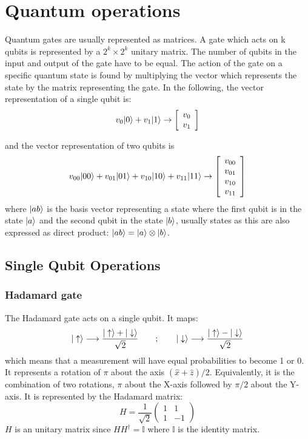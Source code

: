 \chapter{Quantum operations}
\label{operations}
Quantum gates are usually represented as matrices. A gate which acts on k qubits is represented by a $2^k\times2^k$ unitary matrix.
The number of qubits in the input and output of the gate have to be equal. The action of the gate on a specific quantum state is found by multiplying the vector which represents the state by the matrix representing the gate. In the following, the vector representation of a single qubit is:
\begin{equation}
  v_0|0\rangle + v_1|1\rangle \rightarrow \left[\begin{array}{c}
  v_0 \\
  v_1
  \end{array}\right]
\end{equation}

and the vector representation of two qubits is
\begin{equation}
  v_{00}|00\rangle + v_{01}|01\rangle + v_{10}|10\rangle + v_{11}|11\rangle \rightarrow
  \left[\begin{array}{c}
  v_{00} \\
  v_{01} \\
  v_{10} \\
  v_{11}
  \end{array}\right]
\end{equation}
where $|ab\rangle$ is the basis vector representing a state where the first qubit is in the state $|a\rangle$ and the second qubit in the state $|b\rangle$, usually states as this are also expressed as direct product: $|ab\rangle=|a\rangle\otimes|b\rangle$.

\section{Single Qubit Operations}

\subsection{Hadamard gate}
The Hadamard gate acts on a single qubit. It maps:
\begin{equation}
  |\uparrow\rangle \longrightarrow \frac{|\uparrow\rangle+|\downarrow\rangle}{\sqrt{2}} \quad\quad;\quad\quad
  |\downarrow\rangle \longrightarrow \frac{|\uparrow\rangle-|\downarrow\rangle}{\sqrt{2}}
\end{equation}
which means that a measurement will have equal probabilities to become 1 or 0.
It represents a rotation of $\pi$ about the axis $(\hat{x}+\hat{z})/ 2$.
Equivalently, it is the combination of two rotations, $\pi$ about the X-axis followed by $\pi /2$ about the Y-axis. It is represented by the Hadamard matrix:
\begin{equation}
  H=\frac{1}{\sqrt{2}}\left(\begin{array}{cc}
  1 & 1 \\
  1 & -1
  \end{array}\right)
\end{equation}
$H$ is an unitary matrix since $HH^\dagger=\mathbb{I}$ where $\mathbb{I}$ is the identity matrix.

